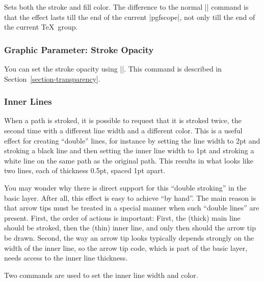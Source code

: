 \begin{command}{\pgfsetcolor{}}
    Sets both the stroke and fill color. The difference to the normal |\color|
    command is that the effect lasts till the end of the current |{pgfscope}|,
    not only till the end of the current \TeX\ group.
\end{command}


\subsubsection{Graphic Parameter: Stroke Opacity}

You can set the stroke opacity using |\pgfsetstrokeopacity|. This command is
described in Section~\ref{section-transparency}.


\subsubsection{Inner Lines}

When a path is stroked, it is possible to request that it is stroked twice, the
second time with a different line width and a different color. This is a useful
effect for creating ``double'' lines, for instance by setting the line width to
2pt and stroking a black line and then setting the inner line width to 1pt and
stroking a white line on the same path as the original path. This results in
what looks like two lines, each of thickness 0.5pt, spaced 1pt apart.

You may wonder why there is direct support for this ``double stroking'' in the
basic layer. After all, this effect is easy to achieve ``by hand''. The main
reason is that arrow tips must be treated in a special manner when such
``double lines'' are present. First, the order of actions is important: First,
the (thick) main line should be stroked, then the (thin) inner line, and only
then should the arrow tip be drawn. Second, the way an arrow tip looks
typically depends strongly on the width of the inner line, so the arrow tip
code, which is part of the basic layer, needs access to the inner line
thickness.

Two commands are used to set the inner line width and color.

